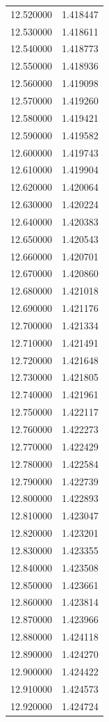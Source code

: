 \begin{tabular}{rr}
12.520000 & 1.418447 \\
12.530000 & 1.418611 \\
12.540000 & 1.418773 \\
12.550000 & 1.418936 \\
12.560000 & 1.419098 \\
12.570000 & 1.419260 \\
12.580000 & 1.419421 \\
12.590000 & 1.419582 \\
12.600000 & 1.419743 \\
12.610000 & 1.419904 \\
12.620000 & 1.420064 \\
12.630000 & 1.420224 \\
12.640000 & 1.420383 \\
12.650000 & 1.420543 \\
12.660000 & 1.420701 \\
12.670000 & 1.420860 \\
12.680000 & 1.421018 \\
12.690000 & 1.421176 \\
12.700000 & 1.421334 \\
12.710000 & 1.421491 \\
12.720000 & 1.421648 \\
12.730000 & 1.421805 \\
12.740000 & 1.421961 \\
12.750000 & 1.422117 \\
12.760000 & 1.422273 \\
12.770000 & 1.422429 \\
12.780000 & 1.422584 \\
12.790000 & 1.422739 \\
12.800000 & 1.422893 \\
12.810000 & 1.423047 \\
12.820000 & 1.423201 \\
12.830000 & 1.423355 \\
12.840000 & 1.423508 \\
12.850000 & 1.423661 \\
12.860000 & 1.423814 \\
12.870000 & 1.423966 \\
12.880000 & 1.424118 \\
12.890000 & 1.424270 \\
12.900000 & 1.424422 \\
12.910000 & 1.424573 \\
12.920000 & 1.424724 \\

\end{tabular}
